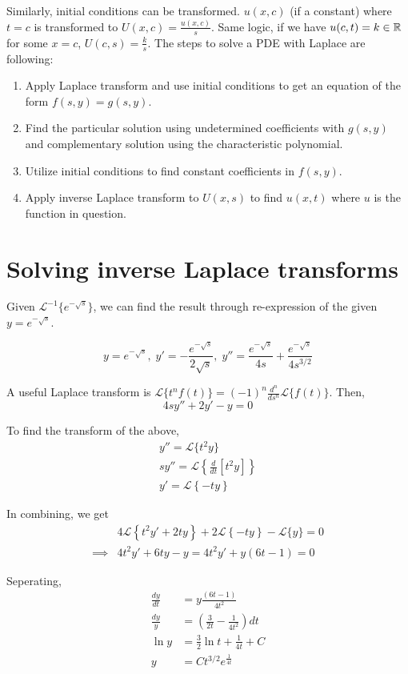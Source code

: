 Similarly, initial conditions can be transformed. $u(x,c)$ (if a constant) where $t=c$
is transformed to $U(x,c)=\frac{u(x,c)}{s}$. Same logic, if we have $u(c,t)=k\in \mathbb{R}$ for some $x=c$, $U(c,s)=\frac{k}{s}$.
The steps to solve a PDE with Laplace are following:
\begin{enumerate}
    \item Apply Laplace transform and use initial conditions to get an equation of the form $f(s,y)=g(s,y)$.
    \item Find the particular solution using undetermined coefficients with $g(s,y)$ and complementary solution using the characteristic polynomial.
    \item Utilize initial conditions to find constant coefficients in $f(s,y)$.
    \item Apply inverse Laplace transform to $U(x,s)$ to find $u(x,t)$ where $u$ is the function in question.
\end{enumerate}

\section{Solving inverse Laplace transforms}

Given $\mathcal{L}^{-1}\{e^{-\sqrt{s}}\}$, we can find the result through
re-expression of the given $y=e^{-\sqrt{s}}$.

\begin{equation}
    y=e^{-\sqrt{s}},\;y'=-\frac{e^{-\sqrt s}}{2\sqrt{s}},\;y''=\frac{e^{-\sqrt s}}{4s}+\frac{e^{-\sqrt{s}}}{4s^{3/2}}
\end{equation}

A useful Laplace transform is $\mathcal{L}\{t^nf(t)\}=(-1)^n\frac{d^n}{ds^n}\mathcal{L}\{f(t)\}$.
Then,
\begin{equation*}
    4sy''+2y'-y=0
\end{equation*}

To find the transform of the above,
\begin{gather}
    y''=\mathcal{L}\{t^2y\}\\
    sy''=\mathcal{L}\left\{\frac{d}{dt}[t^2y]\right\}\\
    y'=\mathcal{L}\left\{-ty\right\}
\end{gather}

In combining, we get
\begin{align*}
    &4\mathcal{L}\left\lbrace t^2y'+2ty\right\rbrace+2\mathcal{L}\left\lbrace -ty\right\rbrace - \mathcal{L}\{y\}=0\\
\implies & 4t^2y'+6ty-y=4t^2y'+y(6t-1)=0
\end{align*}

Seperating,
\begin{align*}
    \frac{dy}{dt}&=y\frac{(6t-1)}{4t^2}\\
    \frac{dy}{y}&=\left(\frac{3}{2t}-\frac{1}{4t^2}\right)dt\\
    \ln y&=\frac{3}{2}\ln t+\frac{1}{4t}+C\\
    y&=Ct^{3/2}e^{\frac{1}{4t}}
\end{align*}